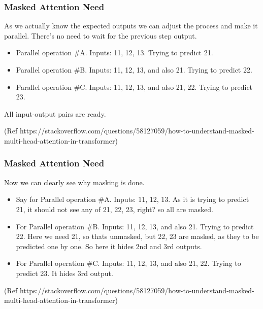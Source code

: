 \begin{frame}[fragile]\frametitle{Masked Attention Need}

As we actually know the expected outputs we can adjust the process and make it parallel. There's no need to wait for the previous step output.

\begin{itemize}
  \item  Parallel operation \#A. Inputs: 11, 12, 13. Trying to predict 21.
  \item Parallel operation \#B. Inputs: 11, 12, 13, and also 21. Trying to predict 22.
	\item Parallel operation \#C. Inputs: 11, 12, 13, and also 21, 22. Trying to predict 23.
\end{itemize}

All input-output pairs are ready.

{\tiny (Ref https://stackoverflow.com/questions/58127059/how-to-understand-masked-multi-head-attention-in-transformer)}

\end{frame}

\begin{frame}[fragile]\frametitle{Masked Attention Need}

Now we can clearly see why masking is done.

\begin{itemize}
  \item  Say for Parallel operation \#A. Inputs: 11, 12, 13. As it is trying to predict 21, it should not see any of 21, 22, 23, right? so all are masked.
  \item For Parallel operation \#B. Inputs: 11, 12, 13, and also 21. Trying to predict 22. Here we need 21, so thats unmasked, but 22, 23 are masked, as they to be predicted one by one. So here it hides  2nd and 3rd outputs.
	\item For Parallel operation \#C. Inputs: 11, 12, 13, and also 21, 22. Trying to predict 23. It hides 3rd output.
\end{itemize}

{\tiny (Ref https://stackoverflow.com/questions/58127059/how-to-understand-masked-multi-head-attention-in-transformer)}

\end{frame}

